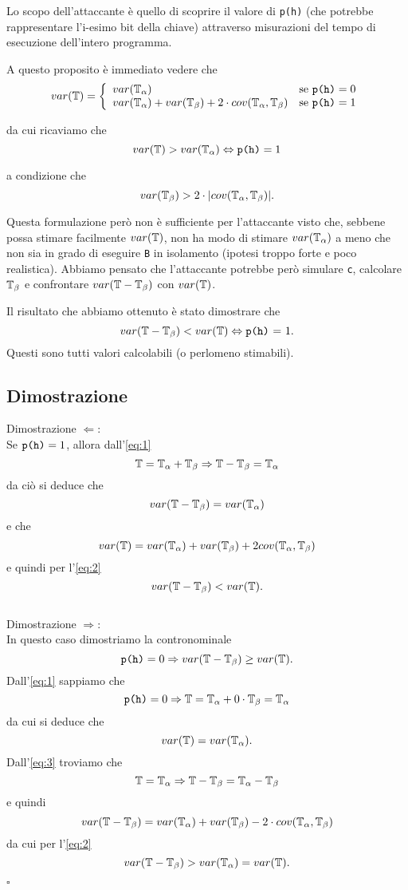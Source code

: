 	Lo scopo dell'attaccante è quello di scoprire il valore di \texttt{p(h)} (che potrebbe rappresentare l'i-esimo bit della chiave) attraverso misurazioni del tempo di esecuzione dell'intero programma.
	
	A questo proposito è immediato vedere che $$var(\mathbb{T})=\left\{\begin{array}{ll}
	var(\mathbb{T}_{\alpha}) & \mathrm{s}\mathrm{e}\ \text{\texttt{p(h)}} = 0\\
	var(\mathbb{T}_{\alpha})+var(\mathbb{T}_{\beta})+2\cdot cov (\mathbb{T}_{\alpha},\mathbb{T}_{\beta}) & \mathrm{s}\mathrm{e}\ \text{\texttt{p(h)}} = 1
	\end{array}\right.$$ 
	
	da cui ricaviamo che $$var(\mathbb{T}) > var(\mathbb{T}_{\alpha}) \Leftrightarrow \text{\texttt{p(h)}} = 1$$ 
	
	a condizione che 
	\begin{equation} \label{eq:2}
		var(\mathbb{T}_{\beta}) > 2 \cdot |cov(\mathbb{T}_{\alpha},\mathbb{T}_{\beta})|.
	\end{equation}
		
	Questa formulazione però non è sufficiente per l'attaccante visto che, sebbene possa stimare facilmente $var(\mathbb{T})$, non ha modo di stimare $var(\mathbb{T}_{\alpha})$ a meno che non sia in grado di eseguire \texttt{B} in isolamento (ipotesi troppo forte e poco realistica). Abbiamo pensato che l'attaccante potrebbe però simulare \texttt{c}, calcolare $\mathbb{T}_{\beta}$ e confrontare $var(\mathbb{T} - \mathbb{T}_{\beta})$ con $var(\mathbb{T})$. 
	
	Il risultato che abbiamo ottenuto è stato dimostrare che $$var(\mathbb{T} - \mathbb{T}_{\beta}) < var(\mathbb{T}) \Leftrightarrow \text{\texttt{p(h)} = 1}.$$ Questi sono tutti valori calcolabili (o perlomeno stimabili).\\
	
	\subsection{Dimostrazione} 
		Dimostrazione $\Leftarrow$:\\
		Se $\text{\texttt{p(h)}} = 1$, allora dall'\cref{eq:1} $$\mathbb{T} = \mathbb{T}_{\alpha} + \mathbb{T}_{\beta} \Rightarrow \mathbb{T} - \mathbb{T}_{\beta} = \mathbb{T}_{\alpha}$$
		da ciò si deduce che $$var(\mathbb{T} - \mathbb{T}_{\beta}) = var(\mathbb{T}_{\alpha})$$ 
		e che $$var(\mathbb{T}) = var(\mathbb{T}_{\alpha}) + var(\mathbb{T}_{\beta}) + 2cov(\mathbb{T}_{\alpha},\mathbb{T}_{\beta})$$
		e quindi per l'\cref{eq:2} $$var(\mathbb{T} - \mathbb{T}_{\beta}) < var(\mathbb{T}).$$\\Dimostrazione $\Rightarrow$:\\
		In questo caso dimostriamo la contronominale $$\text{\texttt{p(h)}} = 0 \Rightarrow var(\mathbb{T} - \mathbb{T}_{\beta}) \geq var(\mathbb{T}).$$  
		Dall'\cref{eq:1} sappiamo che
		\begin{equation} \label{eq:3}
			\text{\texttt{p(h)}} = 0 \Rightarrow \mathbb{T} = \mathbb{T}_{\alpha} + 0\cdot \mathbb{T}_{\beta} = \mathbb{T}_{\alpha}
		\end{equation}
		da cui si deduce che $$var(\mathbb{T}) = var(\mathbb{T}_{\alpha}).$$
		Dall'\cref{eq:3} troviamo che
		$$\mathbb{T} = \mathbb{T}_{\alpha} \Rightarrow \mathbb{T} - \mathbb{T}_{\beta} = \mathbb{T}_{\alpha} - \mathbb{T}_{\beta}$$
		e quindi
		$$var(\mathbb{T} - \mathbb{T}_{\beta}) = var(\mathbb{T}_{\alpha}) + var(\mathbb{T}_{\beta}) - 2\cdot cov (\mathbb{T}_{\alpha},\mathbb{T}_{\beta})$$
		da cui per l'\cref{eq:2}
		$$var(\mathbb{T} - \mathbb{T}_{\beta}) > var(\mathbb{T}_{\alpha}) = var(\mathbb{T}).$$
		\begin{flushright}
			$\square$
		\end{flushright}

